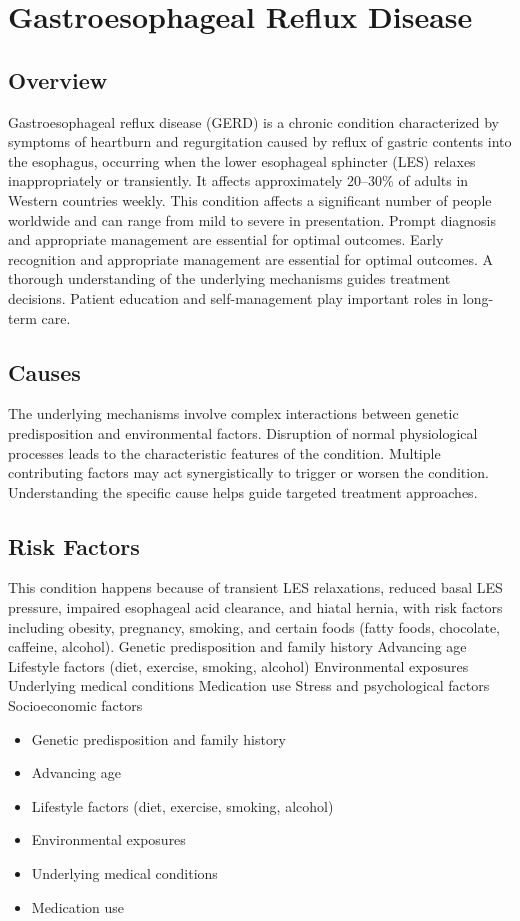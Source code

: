 \chapter{Gastroesophageal Reflux Disease}
\label{sec:Gastroesophageal Reflux Disease}

\section{Overview}
Gastroesophageal reflux disease (GERD) is a chronic condition characterized by symptoms of heartburn and regurgitation caused by reflux of gastric contents into the esophagus, occurring when the lower esophageal sphincter (LES) relaxes inappropriately or transiently. It affects approximately 20--30\% of adults in Western countries weekly. This condition affects a significant number of people worldwide and can range from mild to severe in presentation. Prompt diagnosis and appropriate management are essential for optimal outcomes. Early recognition and appropriate management are essential for optimal outcomes. A thorough understanding of the underlying mechanisms guides treatment decisions. Patient education and self-management play important roles in long-term care.
\section{Causes}
The underlying mechanisms involve complex interactions between genetic predisposition and environmental factors. Disruption of normal physiological processes leads to the characteristic features of the condition. Multiple contributing factors may act synergistically to trigger or worsen the condition. Understanding the specific cause helps guide targeted treatment approaches.
\section{Risk Factors}
This condition happens because of transient LES relaxations, reduced basal LES pressure, impaired esophageal acid clearance, and hiatal hernia, with risk factors including obesity, pregnancy, smoking, and certain foods (fatty foods, chocolate, caffeine, alcohol). Genetic predisposition and family history Advancing age Lifestyle factors (diet, exercise, smoking, alcohol) Environmental exposures Underlying medical conditions Medication use Stress and psychological factors Socioeconomic factors

\begin{itemize}[noitemsep]
  \item Genetic predisposition and family history
  \item Advancing age
  \item Lifestyle factors (diet, exercise, smoking, alcohol)
  \item Environmental exposures
  \item Underlying medical conditions
  \item Medication use
\end{itemize}

